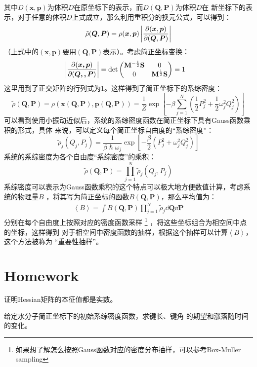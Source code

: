     其中$D(\bm{x},\bm{p})$为体积$D$在原坐标下的表示，而$D(\bm{Q}, \bm{P})$为体积$D$在
    新坐标下的表示，对于任意的体积$D$上式成立，那么利用重积分的换元公式，可以得到：
    \begin{equation}
        \tilde{\rho}(\bm{Q}, \bm{P}) = \rho(\bm{x}, \bm{p})\left|\frac{\partial{(\bm{x}, \bm{p})}}{\partial{(\bm{Q}, \bm{P})}}\right|
    \end{equation}
    （上式中的$(\bm{x}, \bm{p})$要用$(\bm{Q}, \bm{P})$表示）。考虑简正坐标变换：
    \begin{equation}
        \begin{aligned}
            \left|\frac {\partial (\bm{x,p})}{\partial (\bm{Q,,P})}\right| &= \det
            \begin{pmatrix}
                \mathbf{M}^{-\frac{1}{2}}\mathbf{S} & 0\\
                0 & \mathbf{M}^{\frac{1}{2}}\mathbf{S}
            \end{pmatrix}
            = 1
        \end{aligned}
    \end{equation}
    这里用到了正交矩阵的行列式为1。这样得到了简正坐标下的系综密度：
    \begin{equation}
        \tilde{\rho}(\bm{Q}, \bm{P}) = \rho(\bm{x}(\bm{Q}, \bm{P}), \bm{p}(\bm{Q}, \bm{P})) 
        = \frac{1}{Z}\exp\left[-\beta\sum_{j=1}^{N}\left(\frac{1}{2}P_{j}^{2} + \frac{1}{2}\omega_{j}^2 Q_{j}^{2}\right)\right] 
    \end{equation}
    可以看到使用小振动近似后，系统的系综密度函数在简正坐标下具有Gauss函数乘积的形式，具体
    来说，可以定义每个简正坐标自由度的“系综密度”：
    \begin{equation}
        \tilde{\rho}_{j}(Q_j, P_j) = \frac {1}{\beta\hslash\omega_j} \exp\left[-\frac {\beta}2 (P_j^2 + \omega_j^2 Q_j^2)\right]
    \end{equation}
    系统的系综密度为各个自由度“系综密度”的乘积：
    \begin{equation}
        \tilde{\rho}(\bm{Q}, \bm{P}) = \prod_{j=1}^{N}\tilde{\rho}_{j}(Q_j, P_j)
    \end{equation}
    系综密度可以表示为Gauss函数乘积的这个特点可以极大地方便数值计算，考虑系统的物理量$B$
    ，将其写为简正坐标的函数$B(\bm{Q}, \bm{P})$，那么平均值为：
    \begin{equation}
        \begin{split}
            \left<B\right> = \int B(\bm{Q}, \bm{P})\prod_{j=1}^{N}\tilde{\rho}_j\dd \bm{Q}\dd \bm{P}
        \end{split}
    \end{equation}
    分别在每个自由度上按照对应的密度函数采样
    \footnote{
        如果想了解怎么按照Gauss函数对应的密度分布抽样，可以参考Box-Muller sampling
    }
    ，将这些坐标组合为相空间中点的坐标，这样得到
    对于相空间中密度函数的抽样，根据这个抽样可以计算$\left<B\right>$，这个方法被称为
    “重要性抽样”。
    \section{Homework}
    \begin{asg}
        证明Hessian矩阵的本征值都是实数。
    \end{asg}
    \begin{asg}
        给定水分子简正坐标下的初始系综密度函数，求键长、键角
        的期望和涨落随时间的变化。
    \end{asg}


    
    
